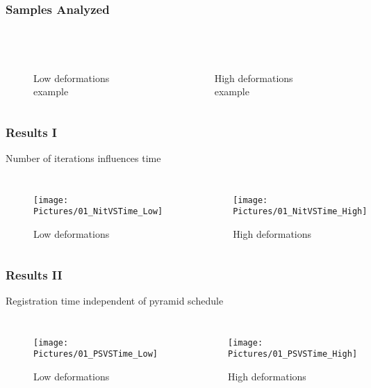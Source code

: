 \documentclass[xcolor=table]{beamer}
\begin{document}
\begin{frame}
	\frametitle{Samples Analyzed}
	\begin{columns}
		\centering
		\begin{figure}
			\\\vspace{2mm}
			\caption{Low deformations example}
		\end{figure}
		\centering
		\begin{figure}
			\\\vspace{2mm}
			\caption{High deformations example}
		\end{figure}
	\end{columns}
\end{frame}



\begin{frame}
	\frametitle{Results I}
	Number of iterations influences time
	\begin{columns}
		\column[c]{0.45\linewidth}
		\centering
		\begin{figure}
			\texttt{[image: Pictures/01\_NitVSTime\_Low]}
			\caption{Low deformations}
		\end{figure}
		\column[c]{0.45\linewidth}
		\centering
		\begin{figure}
			\texttt{[image: Pictures/01\_NitVSTime\_High]}
			\caption{High deformations}
		\end{figure}
	\end{columns}
\end{frame}


\begin{frame}
	\frametitle{Results II}
	Registration time independent of pyramid schedule
	\begin{columns}
		\centering
		\begin{figure}
			\texttt{[image: Pictures/01\_PSVSTime\_Low]}
			\caption{Low deformations}
		\end{figure}
		\centering
		\begin{figure}
			\texttt{[image: Pictures/01\_PSVSTime\_High]}
			\caption{High deformations}
		\end{figure}
	\end{columns}
\end{frame}
\end{document}
